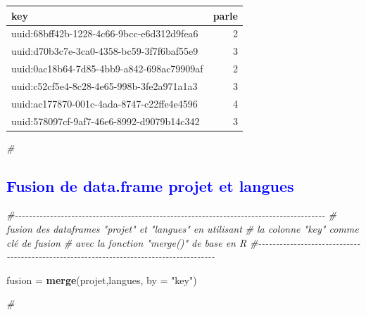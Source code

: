 \documentclass[
]{article}
\newenvironment{Shaded}{\begin{snugshade}}{\end{snugshade}}
\newcommand{\AttributeTok}[1]{\textcolor[rgb]{0.13,0.29,0.53}{#1}}
\newcommand{\CommentTok}[1]{\textcolor[rgb]{0.56,0.35,0.01}{\textit{#1}}}
\newcommand{\FunctionTok}[1]{\textcolor[rgb]{0.13,0.29,0.53}{\textbf{#1}}}
\newcommand{\NormalTok}[1]{#1}
\newcommand{\OtherTok}[1]{\textcolor[rgb]{0.56,0.35,0.01}{#1}}
\newcommand{\StringTok}[1]{\textcolor[rgb]{0.31,0.60,0.02}{#1}}
\begin{document}
\begin{longtable}{lr}
\toprule
key & parle \\ 
\midrule
uuid:68bff42b-1228-4c66-9bcc-e6d312d9fea6 & 2 \\ 
uuid:d70b3c7e-3ca0-4358-bc59-3f7f6baf55e9 & 3 \\ 
uuid:0ac18b64-7d85-4bb9-a842-698ac79909af & 2 \\ 
uuid:c52cf5e4-8c28-4e65-998b-3fe2a971a1a3 & 3 \\ 
uuid:ac177870-001c-4ada-8747-c22ffe4e4596 & 4 \\ 
uuid:578097cf-9af7-46e6-8992-d9079b14c342 & 3 \\ 
\bottomrule
\end{longtable}

\begin{Shaded}
\begin{Highlighting}[]
\CommentTok{\#}
\end{Highlighting}
\end{Shaded}

\textcolor{blue}{\subsection{Fusion de data.frame projet et langues}}

\begin{Shaded}
\begin{Highlighting}[]
\CommentTok{\#{-}{-}{-}{-}{-}{-}{-}{-}{-}{-}{-}{-}{-}{-}{-}{-}{-}{-}{-}{-}{-}{-}{-}{-}{-}{-}{-}{-}{-}{-}{-}{-}{-}{-}{-}{-}{-}{-}{-}{-}{-}{-}{-}{-}{-}{-}{-}{-}{-}{-}{-}{-}{-}{-}{-}{-}{-}{-}{-}{-}{-}{-}{-}{-}{-}{-}{-}{-}{-}{-}{-}{-}{-}{-}{-}{-}{-}{-}{-}{-}{-}{-}{-}{-}{-}{-}{-}{-}}
\CommentTok{\#   fusion des dataframes "projet" et "langues" en utilisant}
\CommentTok{\#          la colonne "key" comme clé de fusion}
\CommentTok{\#              avec la fonction  "merge()" de base en R}
\CommentTok{\#{-}{-}{-}{-}{-}{-}{-}{-}{-}{-}{-}{-}{-}{-}{-}{-}{-}{-}{-}{-}{-}{-}{-}{-}{-}{-}{-}{-}{-}{-}{-}{-}{-}{-}{-}{-}{-}{-}{-}{-}{-}{-}{-}{-}{-}{-}{-}{-}{-}{-}{-}{-}{-}{-}{-}{-}{-}{-}{-}{-}{-}{-}{-}{-}{-}{-}{-}{-}{-}{-}{-}{-}{-}{-}{-}{-}{-}{-}{-}{-}{-}{-}{-}{-}{-}{-}{-}{-}}

\NormalTok{fusion }\OtherTok{=} \FunctionTok{merge}\NormalTok{(projet,langues, }\AttributeTok{by =} \StringTok{"key"}\NormalTok{)}

\CommentTok{\#}
\end{Highlighting}
\end{Shaded}
\end{document}
